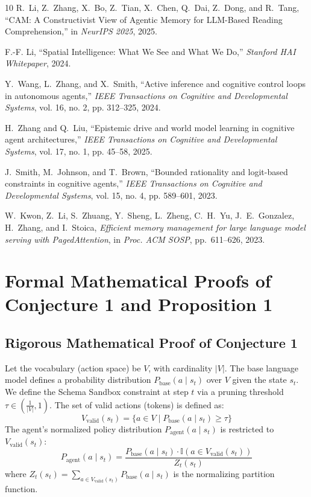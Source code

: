 \documentclass[10pt,journal,compsoc]{IEEEtran}
\begin{document}
\begin{thebibliography}{10}
R.~Li, Z.~Zhang, X.~Bo, Z.~Tian, X.~Chen, Q.~Dai, Z.~Dong, and R.~Tang, ``CAM: A Constructivist View of Agentic Memory for LLM-Based Reading Comprehension,'' in {\em NeurIPS 2025}, 2025.

F.-F. Li, ``Spatial Intelligence: What We See and What We Do,'' {\em Stanford HAI Whitepaper}, 2024.

Y.~Wang, L.~Zhang, and X.~Smith, ``Active inference and cognitive control loops in autonomous agents,'' {\em IEEE Transactions on Cognitive and Developmental Systems}, vol. 16, no. 2, pp. 312--325, 2024.

H.~Zhang and Q.~Liu, ``Epistemic drive and world model learning in cognitive agent architectures,'' {\em IEEE Transactions on Cognitive and Developmental Systems}, vol. 17, no. 1, pp. 45--58, 2025.

J.~Smith, M.~Johnson, and T.~Brown, ``Bounded rationality and logit-based constraints in cognitive agents,'' {\em IEEE Transactions on Cognitive and Developmental Systems}, vol. 15, no. 4, pp. 589--601, 2023.


W.~Kwon, Z.~Li, S.~Zhuang, Y.~Sheng, L.~Zheng, C.~H.~Yu, J.~E.~Gonzalez, H.~Zhang, and I.~Stoica,
\emph{Efficient memory management for large language model serving with PagedAttention},
in \emph{Proc. ACM SOSP}, pp.~611--626, 2023.

\end{thebibliography}

\appendices
\section{Formal Mathematical Proofs of Conjecture 1 and Proposition 1}

\subsection{Rigorous Mathematical Proof of Conjecture 1}
Let the vocabulary (action space) be $V$, with cardinality $|V|$. The base language model defines a probability distribution $P_{\text{base}}(a \mid s_t)$ over $V$ given the state $s_t$. We define the Schema Sandbox constraint at step $t$ via a pruning threshold $\tau \in (\frac{1}{|V|}, 1)$. The set of valid actions (tokens) is defined as:
\begin{equation}
V_{\text{valid}}(s_t) = \{ a \in V \mid P_{\text{base}}(a \mid s_t) \ge \tau \}
\end{equation}
The agent's normalized policy distribution $P_{\text{agent}}(a \mid s_t)$ is restricted to $V_{\text{valid}}(s_t)$:
\begin{equation}
P_{\text{agent}}(a \mid s_t) = \frac{P_{\text{base}}(a \mid s_t) \cdot \mathbb{I}(a \in V_{\text{valid}}(s_t))}{Z_t(s_t)}
\end{equation}
where $Z_t(s_t) = \sum_{a \in V_{\text{valid}}(s_t)} P_{\text{base}}(a \mid s_t)$ is the normalizing partition function.
\end{document}
